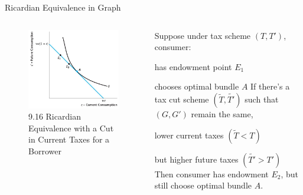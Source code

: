 \documentclass[11pt,aspectratio=169,usenames,dvipsnames]{beamer}
\let\tempone\itemize
\let\temptwo\enditemize
\renewenvironment{itemize}{\tempone\addtolength{\itemsep}{\fill}}{\temptwo}
\begin{document}
\begin{frame}{Ricardian Equivalence in Graph}
\label{slide:Ricardian_Equivalence_in_Graph}
    \begin{columns}
        \begin{column}{0.5\textwidth}
            \begin{figure}
                \caption{\scriptsize 9.16  Ricardian Equivalence with a Cut in Current Taxes for a Borrower}
                \includegraphics[width=.9\textwidth]{./figures/Figure9_16.jpg}
            \end{figure}


        \end{column}
        \begin{column}{0.5\textwidth}
            Suppose under tax scheme $ ( T, T' ) $, consumer:
            \begin{itemize}
                \item has endowment point $ E_{1} $
                \item chooses optimal bundle $ A $
            \end{itemize}
            If there's a tax cut scheme $ ( \tilde{T}, \tilde{T'} ) $ such that $ ( G, G' ) $ remain the same,
            \begin{itemize}
                \item lower current taxes $ ( \tilde{T} < T ) $
                \item but higher future taxes $ ( \tilde{T'} > T' ) $
            \end{itemize}
            Then consumer has endowment $ E_{2} $, but still choose optimal bundle $ A $.
        \end{column}
    \end{columns}
\end{frame}
\end{document}
